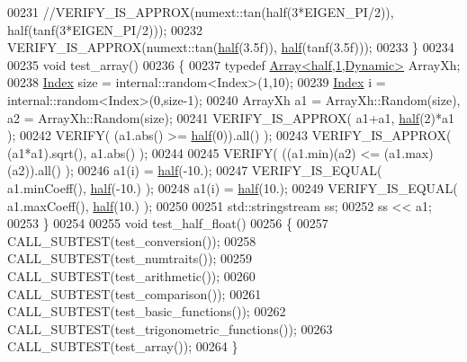 \begin{DoxyCode}
00231   \textcolor{comment}{//VERIFY\_IS\_APPROX(numext::tan(half(3*EIGEN\_PI/2)), half(tanf(3*EIGEN\_PI/2)));}
00232   VERIFY\_IS\_APPROX(numext::tan(\hyperlink{struct_eigen_1_1half}{half}(3.5f)), \hyperlink{struct_eigen_1_1half}{half}(tanf(3.5f)));
00233 \}
00234 
00235 \textcolor{keywordtype}{void} test\_array()
00236 \{
00237   \textcolor{keyword}{typedef} \hyperlink{group___core___module_class_eigen_1_1_array}{Array<half,1,Dynamic>} ArrayXh;
00238   \hyperlink{namespace_eigen_a62e77e0933482dafde8fe197d9a2cfde}{Index} size = internal::random<Index>(1,10);
00239   \hyperlink{namespace_eigen_a62e77e0933482dafde8fe197d9a2cfde}{Index} i = internal::random<Index>(0,size-1);
00240   ArrayXh a1 = ArrayXh::Random(size), a2 = ArrayXh::Random(size);
00241   VERIFY\_IS\_APPROX( a1+a1, \hyperlink{struct_eigen_1_1half}{half}(2)*a1 );
00242   VERIFY( (a1.abs() >= \hyperlink{struct_eigen_1_1half}{half}(0)).all() );
00243   VERIFY\_IS\_APPROX( (a1*a1).sqrt(), a1.abs() );
00244 
00245   VERIFY( ((a1.min)(a2) <= (a1.max)(a2)).all() );
00246   a1(i) = \hyperlink{struct_eigen_1_1half}{half}(-10.);
00247   VERIFY\_IS\_EQUAL( a1.minCoeff(), \hyperlink{struct_eigen_1_1half}{half}(-10.) );
00248   a1(i) = \hyperlink{struct_eigen_1_1half}{half}(10.);
00249   VERIFY\_IS\_EQUAL( a1.maxCoeff(), \hyperlink{struct_eigen_1_1half}{half}(10.) );
00250 
00251   std::stringstream ss;
00252   ss << a1;
00253 \}
00254 
00255 \textcolor{keywordtype}{void} test\_half\_float()
00256 \{
00257   CALL\_SUBTEST(test\_conversion());
00258   CALL\_SUBTEST(test\_numtraits());
00259   CALL\_SUBTEST(test\_arithmetic());
00260   CALL\_SUBTEST(test\_comparison());
00261   CALL\_SUBTEST(test\_basic\_functions());
00262   CALL\_SUBTEST(test\_trigonometric\_functions());
00263   CALL\_SUBTEST(test\_array());
00264 \}
\end{DoxyCode}
